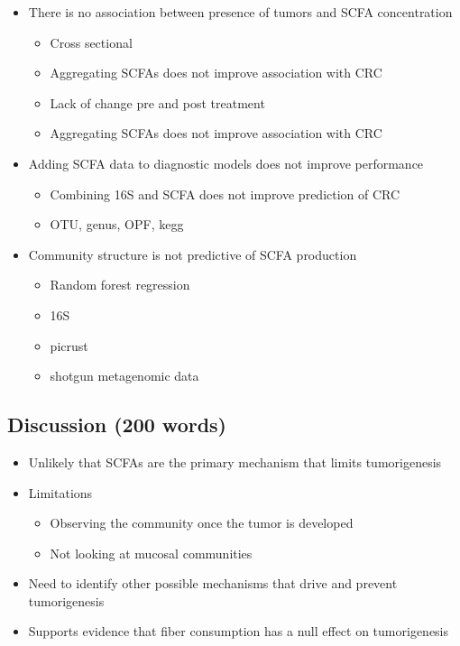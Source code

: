 \documentclass[11pt,]{article}
\providecommand{\tightlist}{%
  \setlength{\itemsep}{0pt}\setlength{\parskip}{0pt}}
\begin{document}
\begin{itemize}
\tightlist
\item
  There is no association between presence of tumors and SCFA
  concentration

  \begin{itemize}
  \tightlist
  \item
    Cross sectional
  \item
    Aggregating SCFAs does not improve association with CRC
  \item
    Lack of change pre and post treatment
  \item
    Aggregating SCFAs does not improve association with CRC
  \end{itemize}
\item
  Adding SCFA data to diagnostic models does not improve performance

  \begin{itemize}
  \tightlist
  \item
    Combining 16S and SCFA does not improve prediction of CRC
  \item
    OTU, genus, OPF, kegg
  \end{itemize}
\item
  Community structure is not predictive of SCFA production

  \begin{itemize}
  \tightlist
  \item
    Random forest regression
  \item
    16S
  \item
    picrust
  \item
    shotgun metagenomic data
  \end{itemize}
\end{itemize}

\newpage

\hypertarget{discussion-200-words}{%
\subsection{Discussion (200 words)}\label{discussion-200-words}}

\begin{itemize}
\tightlist
\item
  Unlikely that SCFAs are the primary mechanism that limits
  tumorigenesis
\item
  Limitations

  \begin{itemize}
  \tightlist
  \item
    Observing the community once the tumor is developed
  \item
    Not looking at mucosal communities
  \end{itemize}
\item
  Need to identify other possible mechanisms that drive and prevent
  tumorigenesis
\item
  Supports evidence that fiber consumption has a null effect on
  tumorigenesis
\end{itemize}
\end{document}
